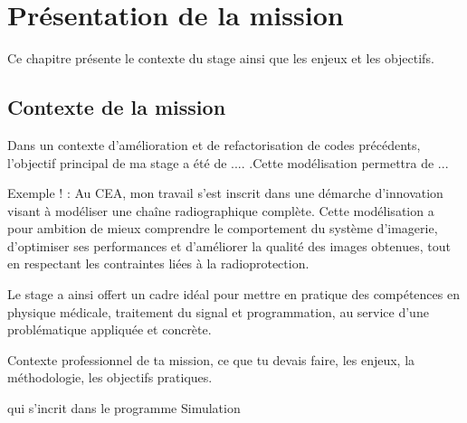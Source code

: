 \documentclass[12pt,a4paper]{report}
\begin{document}
\chapter{Présentation de la mission}

Ce chapitre présente le contexte du stage ainsi que les enjeux et les objectifs.

\section{Contexte de la mission}
 Dans un contexte d'amélioration et de refactorisation de codes précédents, l'objectif principal de ma stage a été de .... .Cette modélisation permettra de ...



Exemple ! : Au CEA, mon travail s'est inscrit dans une démarche d'innovation visant à modéliser une chaîne radiographique complète. Cette modélisation a pour ambition de mieux comprendre le comportement du système d'imagerie, d'optimiser ses performances et d'améliorer la qualité des images obtenues, tout en respectant les contraintes liées à la radioprotection.

Le stage a ainsi offert un cadre idéal pour mettre en pratique des compétences en physique médicale, traitement du signal et programmation, au service d'une problématique appliquée et concrète.


Contexte professionnel de ta mission, ce que tu devais faire, les enjeux, la méthodologie, les objectifs pratiques.

qui s'incrit dans le programme Simulation
\end{document}
